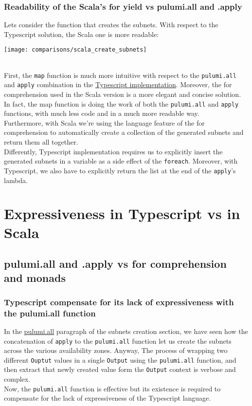 \subsubsection{Readability of the Scala's for yield vs pulumi.all and .apply}
\label{sssec:readability-for-yield}
Lets consider the function that creates the subnets.
With respect to the Typescript solution, the Scala one is more readable:
\begin{center}
  \texttt{[image: comparisons/scala\_create\_subnets]} 
\end{center}\mbox{}\\
First, the \texttt{map} function is much more intuitive with respect to the \texttt{pulumi.all} and \texttt{apply} combination in the \hyperref[sssec:ts-subnets-comparison]{Typescript implementation}.
Moreover, the for comprehension used in the Scala version is a more elegant and concise solution.
In fact, the map function is doing the work of both the \texttt{pulumi.all} and \texttt{apply} functions, with much less code and in a much more readable way.\\
Furthermore, with Scala we're using the language feature of the for comprehension to automatically create a collection of the generated subnets and return them all together.\\
Differently, Typescript implementation requires us to explicitly insert the generated subnets in a variable as a side effect of the \texttt{foreach}.
Moreover, with Typescript, we also have to explicitly return the list at the end of the \texttt{apply}'s lambda.


\section{Expressiveness in Typescript vs in Scala}

\subsection{pulumi.all and .apply vs for comprehension and monads}

\subsubsection{Typescript compensate for its lack of expressiveness with the pulumi.all function}
In the \hyperref[sssec:pulumi-all]{pulumi.all} paragraph of the subnets creation section, we have seen how the concatenation of \texttt{apply} to the \texttt{pulumi.all} function let us create the subnets across the various availability zones.
Anyway, The process of wrapping two different \texttt{Ouptut} values in a single \texttt{Output} using the \texttt{pulumi.all} function, and then extract that newly created value form the \texttt{Output} context is verbose and complex.\\
Now, the \texttt{pulumi.all} function is effective but its existence is required to compensate for the lack of expressiveness of the Typescript language.

